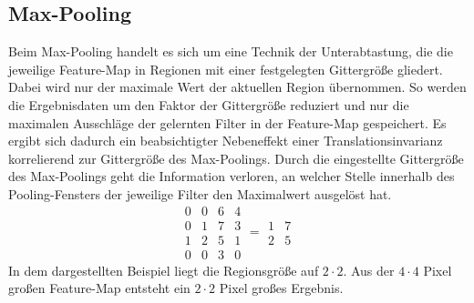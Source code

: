 \subsection{Max-Pooling}
Beim Max-Pooling handelt es sich um eine Technik der Unterabtastung, die die jeweilige Feature-Map in Regionen mit einer festgelegten Gittergröße gliedert. 
Dabei wird nur der maximale Wert der aktuellen Region übernommen.
So werden die Ergebnisdaten um den Faktor der Gittergröße reduziert und nur die maximalen Ausschläge der gelernten Filter in der Feature-Map gespeichert.
Es ergibt sich dadurch ein beabsichtigter Nebeneffekt einer Translationsinvarianz korrelierend zur Gittergröße des Max-Poolings. Durch die eingestellte Gittergröße des Max-Poolings geht die Information verloren, an welcher Stelle innerhalb des Pooling-Fensters der jeweilige Filter den Maximalwert ausgelöst hat.\newline
\begin{equation*}
\begin{matrix}
 0 & 0 & 6 & 4 \\
 0 & 1 & 7 & 3 \\
 1 & 2 & 5 & 1 \\
 0 & 0 & 3 & 0
\end{matrix} =
\begin{matrix}
 1 & 7 \\
 2 & 5  
\end{matrix}
\end{equation*}
In dem dargestellten Beispiel liegt die Regionsgröße auf $2 \cdot 2$. Aus der $4 \cdot 4$ Pixel großen Feature-Map entsteht ein $2 \cdot 2$ Pixel großes Ergebnis.  


